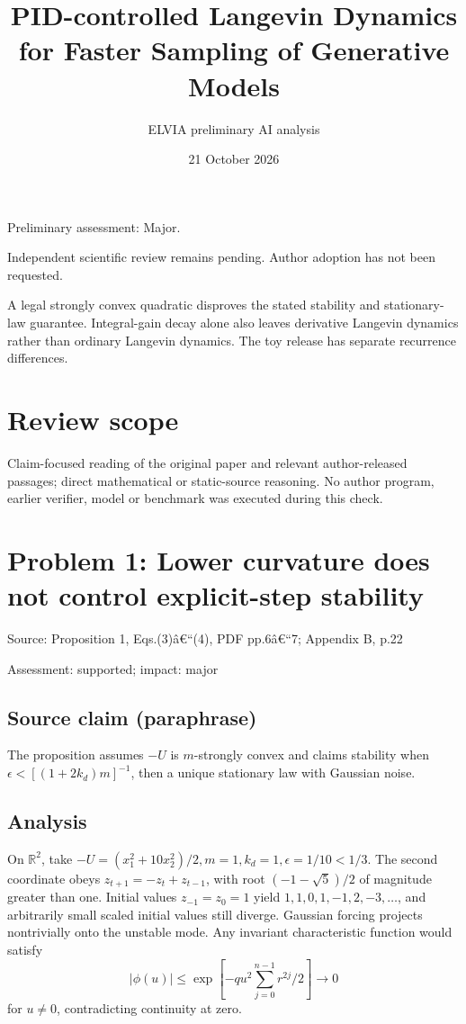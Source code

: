 \documentclass[11pt]{article}
\begin{document}
\title{PID-controlled Langevin Dynamics for Faster Sampling of Generative Models}

\author{ELVIA preliminary AI analysis}\date{21 October 2026}\maketitle

Preliminary assessment: Major.\par

Independent scientific review remains pending. Author adoption has not been requested.

A legal strongly convex quadratic disproves the stated stability and stationary-law guarantee. Integral-gain decay alone also leaves derivative Langevin dynamics rather than ordinary Langevin dynamics. The toy release has separate recurrence differences.

\section*{Review scope}

Claim-focused reading of the original paper and relevant author-released passages; direct mathematical or static-source reasoning. No author program, earlier verifier, model or benchmark was executed during this check.

\section*{Problem 1: Lower curvature does not control explicit-step stability}

Source: Proposition 1, Eqs.(3)â€“(4), PDF pp.6â€“7; Appendix B, p.22

Assessment: supported; impact: major

\subsection*{Source claim (paraphrase)}

The proposition assumes \(-U\) is \(m\)-strongly convex and claims stability when \(\epsilon<[(1+2k_d)m]^{-1}\), then a unique stationary law with Gaussian noise.

\subsection*{Analysis}

On \(\mathbb R^2\), take \(-U=(x_1^2+10x_2^2)/2,m=1,k_d=1,\epsilon=1/10<1/3\). The second coordinate obeys \(z_{t+1}=-z_t+z_{t-1}\), with root \((-1-\sqrt5)/2\) of magnitude greater than one. Initial values \(z_{-1}=z_0=1\) yield \(1,1,0,1,-1,2,-3,\ldots\), and arbitrarily small scaled initial values still diverge. Gaussian forcing projects nontrivially onto the unstable mode. Any invariant characteristic function would satisfy \[|\phi(u)|\le\exp[-qu^2\sum_{j=0}^{n-1}r^{2j}/2]\to0\] for \(u\ne0\), contradicting continuity at zero.
\end{document}
